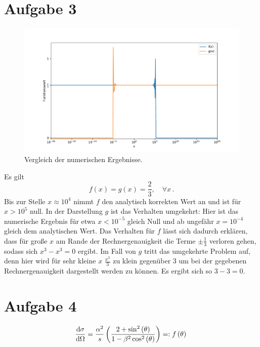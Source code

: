 \documentclass[a4paper, 11pt]{article}
\begin{document}
\FloatBarrier
\section*{Aufgabe 3}
\begin{figure}
    \centering
    \includegraphics[width=\textwidth]{../A03/A3.pdf}
    \caption{Vergleich der numerischen Ergebnisse.}
    \label{fig:a3}
\end{figure}

Es gilt
\begin{equation}
    f(x) = g(x) = \frac{2}{3},\quad \forall x\,.
\end{equation}
Bis zur Stelle $x \approx 10^{4}$ nimmt $f$ den analytisch korrekten Wert an und ist für $x > 10^{5}$ null. In der Darstellung $g$ ist das Verhalten umgekehrt: Hier ist das numerische Ergebnis für etwa $x < 10^{-5}$ gleich Null und ab ungefähr $x = 10^{-4}$ gleich dem analytischen Wert. Das Verhalten für $f$ lässt sich dadurch erklären, dass für große $x$ am Rande der Rechnergenauigkeit die Terme $\pm \frac{1}{3}$ verloren gehen, sodass sich $x^3 - x^3 = 0$ ergibt. Im Fall von $g$ tritt das umgekehrte Problem auf, denn hier wird für sehr kleine $x$ $\frac{x^3}{3}$ zu klein gegenüber 3 um bei der gegebenen Rechnergenauigkeit dargestellt werden zu können. Es ergibt sich so $3 - 3 = 0$.

\FloatBarrier
\section*{Aufgabe 4}
\begin{equation}
    \frac{\mathrm{d}\sigma}{\mathrm{d}\Omega} = \frac{\alpha^2}{s}
    \left(\frac{2+\sin^2\left(\theta\right)}{1-\beta^2 \cos^2\left(\theta\right)}\right) =: f\left(\theta\right)\\
    \label{eqn:dsdo}
\end{equation}
\end{document}
